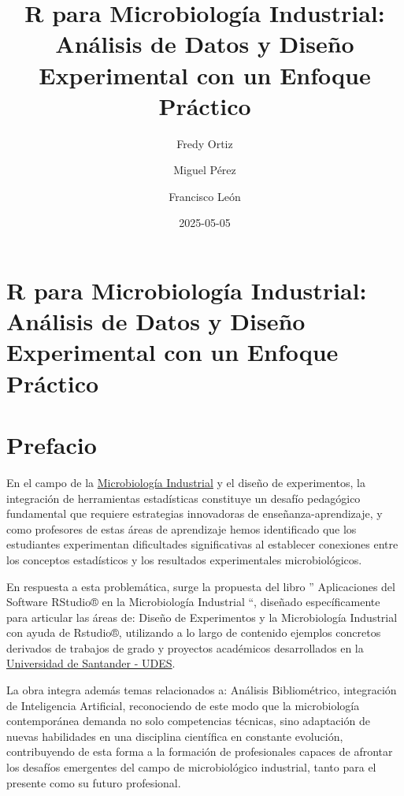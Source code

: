 \documentclass[
  spanish,
  letterpaper,
  DIV=11,
  numbers=noendperiod]{scrreprt}
\title{R para Microbiología Industrial: Análisis de Datos y Diseño
Experimental con un Enfoque Práctico}
\author{Fredy Ortiz \and Miguel Pérez \and Francisco León}
\date{2025-05-05}
\renewcommand*\contentsname{Tabla de contenidos}
\newcommand\contentsname{Tabla de contenidos}
\begin{document}
\maketitle

\renewcommand*\contentsname{Tabla de contenidos}
{
\hypersetup{linkcolor=}
\setcounter{tocdepth}{2}
\tableofcontents
}


\chapter{R para Microbiología Industrial: Análisis de Datos y Diseño
Experimental con un Enfoque
Práctico}\label{r-para-microbiologuxeda-industrial-anuxe1lisis-de-datos-y-diseuxf1o-experimental-con-un-enfoque-pruxe1ctico}


\chapter*{Prefacio}\label{prefacio}


En el campo de la
\href{https://bucaramanga.udes.edu.co/estudia/pregrados/microbiologia-industrial}{Microbiología
Industrial} y el diseño de experimentos, la integración de herramientas
estadísticas constituye un desafío pedagógico fundamental que requiere
estrategias innovadoras de enseñanza-aprendizaje, y como profesores de
estas áreas de aprendizaje hemos identificado que los estudiantes
experimentan dificultades significativas al establecer conexiones entre
los conceptos estadísticos y los resultados experimentales
microbiológicos.

En respuesta a esta problemática, surge la propuesta del libro ''
Aplicaciones del Software RStudio® en la Microbiología Industrial ``,
diseñado específicamente para articular las áreas de: Diseño de
Experimentos y la Microbiología Industrial con ayuda de Rstudio®,
utilizando a lo largo de contenido ejemplos concretos derivados de
trabajos de grado y proyectos académicos desarrollados en la
\href{https://udes.edu.co/}{Universidad de Santander - UDES}.

La obra integra además temas relacionados a: Análisis Bibliométrico,
integración de Inteligencia Artificial, reconociendo de este modo que la
microbiología contemporánea demanda no solo competencias técnicas, sino
adaptación de nuevas habilidades en una disciplina científica en
constante evolución, contribuyendo de esta forma a la formación de
profesionales capaces de afrontar los desafíos emergentes del campo de
microbiológico industrial, tanto para el presente como su futuro
profesional.
\end{document}
